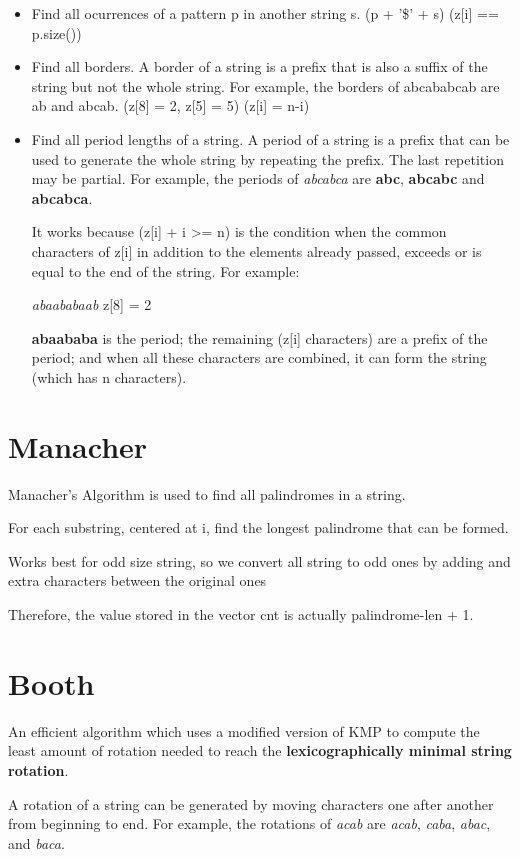     \begin{itemize}
		\item Find all ocurrences of a pattern p in another string s. 
        (p + '\$' + s) (z[i] == p.size())

        \item Find all borders. A border of a string is a prefix that is also a suffix of 
        the string but not the whole string. 
        For example, the borders of abcababcab are ab and abcab. (z[8] = 2, z[5] = 5)
        (z[i] = n-i)

        \item Find all period lengths of a string. 
        A period of a string is a prefix that can be used to generate the whole string by repeating
        the prefix. The last repetition may be partial. For example, the periods of \textit{abcabca} 
        are \textbf{abc}, \textbf{abcabc} and \textbf{abcabca}.

        It works because (z[i] + i >= n) is the condition when the common characters of z[i] in addition
        to the elements already passed, exceeds or is equal to the end of the string. For example:

        \textit{abaababaab}
        z[8] = 2

        \textbf{abaababa} is the period; the remaining (z[i] characters) are a prefix of the period; 
        and when all these characters are combined, it can form the string (which has n characters).

	\end{itemize}


\section{Manacher}

    Manacher's Algorithm is used to find all palindromes in a string.

    For each substring, centered at i, find the longest palindrome that can be formed.
    
    Works best for odd size string, so we convert all string to odd ones
    by adding and extra characters between the original ones

    Therefore, the value stored in the vector cnt is actually palindrome-len + 1.


\section{Booth}

    An efficient algorithm which uses a modified version of KMP to compute the
    least amount of rotation needed to reach the \textbf{lexicographically minimal string rotation}.

    A rotation of a string can be generated by moving characters one after another from beginning to end.
    For example, the rotations of \textit{acab} are \textit{acab}, \textit{caba}, \textit{abac}, and \textit{baca}.


